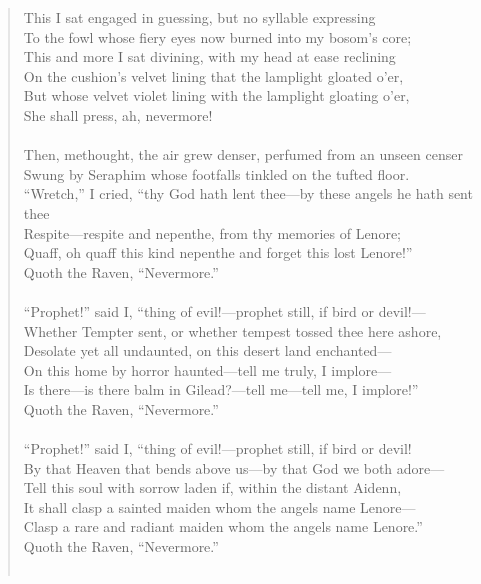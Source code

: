 \documentclass[12pt, a4paper]{article}
\begin{document}
\begin{quote}
{This I sat engaged in guessing, but no syllable expressing \\
To the fowl whose fiery eyes now burned into my bosom's core; \\
This and more I sat divining, with my head at ease reclining \\
On the cushion's velvet lining that the lamplight gloated o'er, \\
But whose velvet violet lining with the lamplight gloating o'er, \\
She shall press, ah, nevermore! \\
\\
Then, methought, the air grew denser, perfumed from an unseen censer \\
Swung by Seraphim whose footfalls tinkled on the tufted floor. \\
“Wretch,” I cried, “thy God hath lent thee—by these angels he hath sent thee \\
Respite—respite and nepenthe, from thy memories of Lenore; \\
Quaff, oh quaff this kind nepenthe and forget this lost Lenore!” \\
Quoth the Raven, “Nevermore.” \\
\\
“Prophet!” said I, “thing of evil!—prophet still, if bird or devil!— \\
Whether Tempter sent, or whether tempest tossed thee here ashore, \\
Desolate yet all undaunted, on this desert land enchanted— \\
On this home by horror haunted—tell me truly, I implore— \\
Is there—is there balm in Gilead?—tell me—tell me, I implore!” \\
Quoth the Raven, “Nevermore.” \\
\\
“Prophet!” said I, “thing of evil!—prophet still, if bird or devil! \\
By that Heaven that bends above us—by that God we both adore— \\
Tell this soul with sorrow laden if, within the distant Aidenn, \\
It shall clasp a sainted maiden whom the angels name Lenore— \\
Clasp a rare and radiant maiden whom the angels name Lenore.” \\
Quoth the Raven, “Nevermore.” \\
\\
}
\end{quote}
\end{document}
